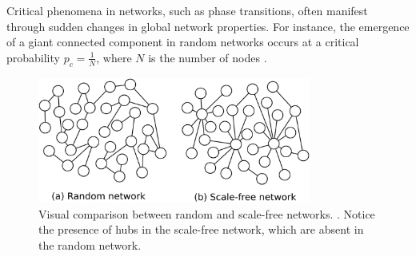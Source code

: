 Critical phenomena in networks, such as phase transitions, often manifest through sudden changes in global network properties. For instance, the emergence of a giant connected component in random networks occurs at a critical probability $p_c = \frac{1}{N}$, where $N$ is the number of nodes \citep{erdos1960evolution}.

\begin{figure}[htbp]
    \centering
    \includegraphics[width=0.8\textwidth]{figures/scalefree.png}
    \caption{Visual comparison between random and scale-free networks. \citep{wikipedia2023scalefree}. Notice the presence of hubs in the scale-free network, which are absent in the random network.}
    \label{fig:small_world}
\end{figure}

